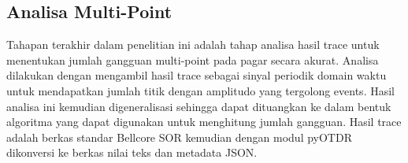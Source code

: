 \documentclass[12pt]{article}
\begin{document}
%	
%	
%
%	
%
%	
\newpage
	\subsection{Analisa Multi-Point}
	
	Tahapan terakhir dalam penelitian ini adalah tahap analisa hasil trace untuk menentukan jumlah gangguan multi-point pada pagar secara akurat.
	Analisa dilakukan dengan mengambil hasil trace sebagai sinyal periodik domain waktu untuk mendapatkan jumlah titik dengan amplitudo yang tergolong events.
	Hasil analisa ini kemudian digeneralisasi sehingga dapat dituangkan ke dalam bentuk algoritma yang dapat digunakan untuk menghitung jumlah gangguan.
	Hasil trace adalah berkas standar Bellcore SOR kemudian dengan modul pyOTDR dikonversi ke berkas nilai teks dan metadata JSON.
\end{document}
